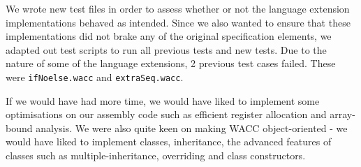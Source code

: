 \documentclass[11pt,a4paper]{article}
\begin{document}
We wrote new test files in order to assess whether or not the language extension implementations behaved as intended. Since we also wanted to ensure that these implementations did not brake any of the original specification elements, we adapted out test scripts to run all previous tests and new tests. Due to the nature of some of the language extensions, 2 previous test cases failed. These were \texttt{ifNoelse.wacc} and \texttt{extraSeq.wacc}.

If we would have had more time, we would have liked to implement some optimisations on our assembly code such as efficient register allocation and array-bound analysis. We were also quite keen on making WACC object-oriented - we would have liked to implement classes, inheritance, the advanced features of classes such as multiple-inheritance, overriding and class constructors.
\end{document}
